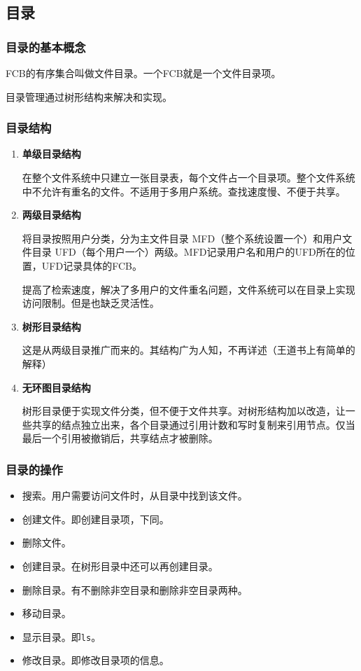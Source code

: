 \documentclass[12pt, a4paper, oneside]{ctexart}
\begin{document}
\subsection{目录}

\subsubsection{目录的基本概念}

FCB的有序集合叫做文件目录。一个FCB就是一个文件目录项。

目录管理通过树形结构来解决和实现。

\subsubsection{目录结构}

\begin{enumerate}
  \item {\bf 单级目录结构}
  
  在整个文件系统中只建立一张目录表，每个文件占一个目录项。整个文件系统中不允许有重名的文件。不适用于多用户系统。查找速度慢、不便于共享。

  \item {\bf 两级目录结构}
  
  将目录按照用户分类，分为主文件目录 MFD（整个系统设置一个）和用户文件目录 UFD（每个用户一个）两级。MFD记录用户名和用户的UFD所在的位置，UFD记录具体的FCB。

  提高了检索速度，解决了多用户的文件重名问题，文件系统可以在目录上实现访问限制。但是也缺乏灵活性。

  \item {\bf 树形目录结构}
  
  这是从两级目录推广而来的。其结构广为人知，不再详述（王道书上有简单的解释）

  \item {\bf 无环图目录结构}
  
  树形目录便于实现文件分类，但不便于文件共享。对树形结构加以改造，让一些共享的结点独立出来，各个目录通过引用计数和写时复制来引用节点。仅当最后一个引用被撤销后，共享结点才被删除。
\end{enumerate}

\subsubsection{目录的操作}

\begin{itemize}
  \item 搜索。用户需要访问文件时，从目录中找到该文件。
  \item 创建文件。即创建目录项，下同。
  \item 删除文件。
  \item 创建目录。在树形目录中还可以再创建目录。
  \item 删除目录。有不删除非空目录和删除非空目录两种。
  \item 移动目录。
  \item 显示目录。即\verb|ls|。
  \item 修改目录。即修改目录项的信息。
\end{itemize}
\end{document}
